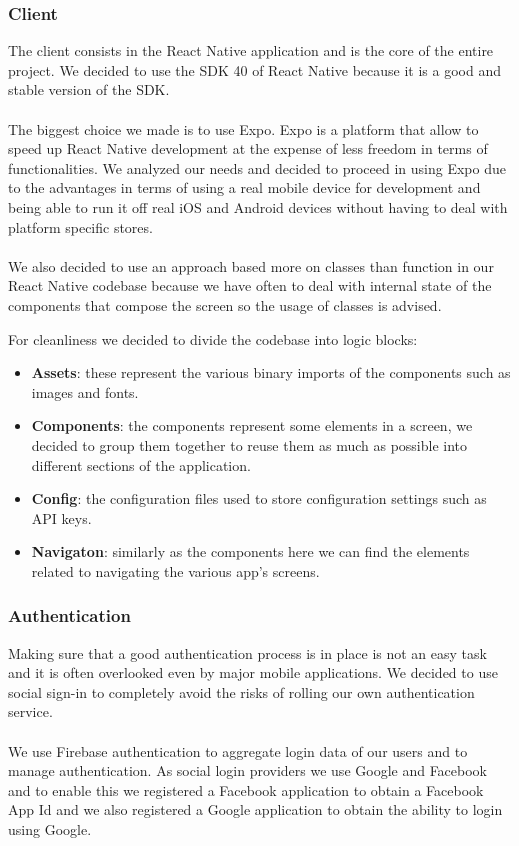 \documentclass[10pt]{article}
\begin{document}
	
	\subsubsection{Client}
	The client consists in the React Native application and is the core of the entire project. We decided to use the SDK 40 of React Native because it is a good and stable version of the SDK. \\\\ The biggest choice we made is to use Expo. Expo is a platform that allow to speed up React Native development at the expense of less freedom in terms of functionalities. We analyzed our needs and decided to proceed in using Expo due to the advantages in terms of using a real mobile device for development and being able to run it off real iOS and Android devices without having to deal with platform specific stores. \\\\ We also decided to use an approach based more on classes than function in our React Native codebase because we have often to deal with internal state of the components that compose the screen so the usage of classes is advised.
	
	For cleanliness we decided to divide the codebase into logic blocks:
	\begin{itemize}
		\item \textbf{Assets}: these represent the various binary imports of the components such as images and fonts.
		\item \textbf{Components}: the components represent some elements in a screen, we decided to group them together to reuse them as much as possible into different sections of the application.
		\item \textbf{Config}: the configuration files used to store configuration settings such as API keys.
		\item \textbf{Navigaton}: similarly as the components here we can find the elements related to navigating the various app's screens.
	\end{itemize}
	
	\subsubsection{Authentication}
	Making sure that a good authentication process is in place is not an easy task and it is often overlooked even by major mobile applications. We decided to use social sign-in to completely avoid the risks of rolling our own authentication service. \\\\ We use Firebase authentication to aggregate login data of our users and to manage authentication. As social login providers we use Google and Facebook and to enable this we registered a Facebook application to obtain a Facebook App Id and we also registered a Google application to obtain the ability to login using Google. 
	
\end{document}
